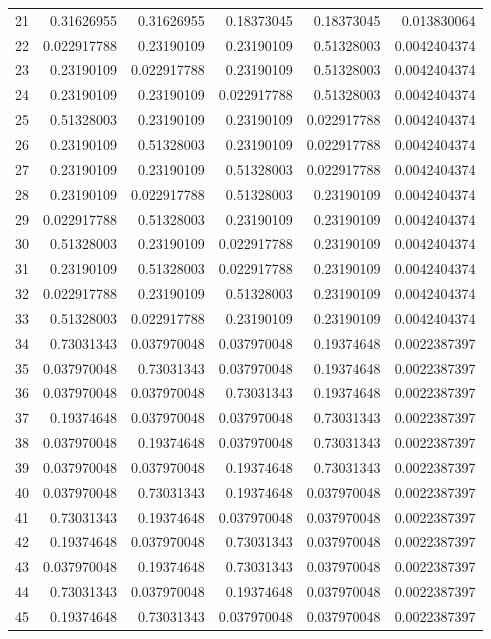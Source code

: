 \begin{table}[H]
\begin{tabular}{@{}rrrrrr@{}}
21 & 0.31626955 & 0.31626955 & 0.18373045 & 0.18373045 & 0.013830064 \\
22 & 0.022917788 & 0.23190109 & 0.23190109 & 0.51328003 & 0.0042404374 \\
23 & 0.23190109 & 0.022917788 & 0.23190109 & 0.51328003 & 0.0042404374 \\
24 & 0.23190109 & 0.23190109 & 0.022917788 & 0.51328003 & 0.0042404374 \\
25 & 0.51328003 & 0.23190109 & 0.23190109 & 0.022917788 & 0.0042404374 \\
26 & 0.23190109 & 0.51328003 & 0.23190109 & 0.022917788 & 0.0042404374 \\
27 & 0.23190109 & 0.23190109 & 0.51328003 & 0.022917788 & 0.0042404374 \\
28 & 0.23190109 & 0.022917788 & 0.51328003 & 0.23190109 & 0.0042404374 \\
29 & 0.022917788 & 0.51328003 & 0.23190109 & 0.23190109 & 0.0042404374 \\
30 & 0.51328003 & 0.23190109 & 0.022917788 & 0.23190109 & 0.0042404374 \\
31 & 0.23190109 & 0.51328003 & 0.022917788 & 0.23190109 & 0.0042404374 \\
32 & 0.022917788 & 0.23190109 & 0.51328003 & 0.23190109 & 0.0042404374 \\
33 & 0.51328003 & 0.022917788 & 0.23190109 & 0.23190109 & 0.0042404374 \\
34 & 0.73031343 & 0.037970048 & 0.037970048 & 0.19374648 & 0.0022387397 \\
35 & 0.037970048 & 0.73031343 & 0.037970048 & 0.19374648 & 0.0022387397 \\
36 & 0.037970048 & 0.037970048 & 0.73031343 & 0.19374648 & 0.0022387397 \\
37 & 0.19374648 & 0.037970048 & 0.037970048 & 0.73031343 & 0.0022387397 \\
38 & 0.037970048 & 0.19374648 & 0.037970048 & 0.73031343 & 0.0022387397 \\
39 & 0.037970048 & 0.037970048 & 0.19374648 & 0.73031343 & 0.0022387397 \\
40 & 0.037970048 & 0.73031343 & 0.19374648 & 0.037970048 & 0.0022387397 \\
41 & 0.73031343 & 0.19374648 & 0.037970048 & 0.037970048 & 0.0022387397 \\
42 & 0.19374648 & 0.037970048 & 0.73031343 & 0.037970048 & 0.0022387397 \\
43 & 0.037970048 & 0.19374648 & 0.73031343 & 0.037970048 & 0.0022387397 \\
44 & 0.73031343 & 0.037970048 & 0.19374648 & 0.037970048 & 0.0022387397 \\
45 & 0.19374648 & 0.73031343 & 0.037970048 & 0.037970048 & 0.0022387397 \\
\bottomrule
\end{tabular}
\end{table}
\normalsize
